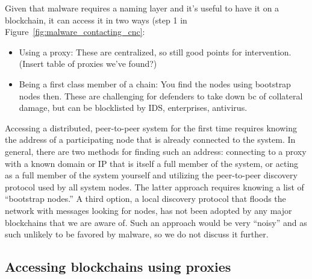 \documentclass[10pt,sigconf,letterpaper]{acmart}
\begin{document}
Given that malware requires a naming layer and it’s useful to have it on a 
blockchain, it can access it in two ways (step 1 in 
Figure~\ref{fig:malware_contacting_cnc}:
\begin{itemize}
	\item Using a proxy: These are centralized, so still good points for 
	intervention. (Insert table of proxies we've found?)
	\item Being a first class member of a chain: You find the nodes using 
	bootstrap nodes then. These are challenging for defenders to take down bc 
	of collateral damage, but can be blocklisted by IDS, 
	enterprises, antivirus. 
\end{itemize}

Accessing a distributed, peer-to-peer system for the first 
time requires knowing the address of a participating node 
that is already connected to the system. In general, there 
are two methods for finding such an address: connecting to a 
proxy with a known domain or IP that is itself a full member 
of the system, or acting as a full member of the system 
yourself and utilizing the peer-to-peer discovery protocol 
used by all system nodes. The latter approach requires 
knowing a list of ``bootstrap nodes.'' A third option, a 
local discovery protocol that floods the network with 
messages looking for nodes, has not been adopted by any major 
blockchains that we are aware of. Such an approach would be 
very ``noisy'' and as such unlikely to be favored by malware, 
so we do not discuss it further.

\subsection{Accessing blockchains using proxies}
\end{document}
